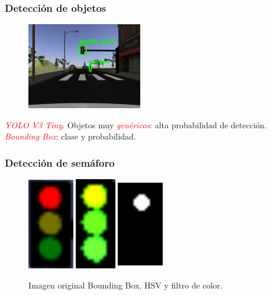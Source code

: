 \documentclass{beamer}
\begin{document}
\begin{frame}
	\frametitle{Detección de objetos}
	\begin{figure}
		\centering
		\includegraphics[width=5cm]{figs/darknetSimulator}
	\end{figure}
	\begin{outline}
		\1 \textcolor{red}{\textit{YOLO V3 Tiny}}.
		\1 Objetos muy \textcolor{red}{\textit{genéricos}}: alta probabilidad de detección.
		\1 \textcolor{red}{\textit{Bounding Box}}: clase y probabilidad.
	\end{outline}
\end{frame}

\begin{frame}
	\frametitle{Detección de semáforo}
	\begin{figure}
		\centering
		\includegraphics[width=2cm, height=4cm]{figs/cropped}\hspace{2cm}\includegraphics[width=2cm, height=4cm]{figs/hsv}\hspace{2cm}\includegraphics[width=2cm,
			height=4cm]{figs/mask}
		\caption{Imagen original Bounding Box, HSV y filtro de color.}
	\end{figure}
\end{frame}
\end{document}
